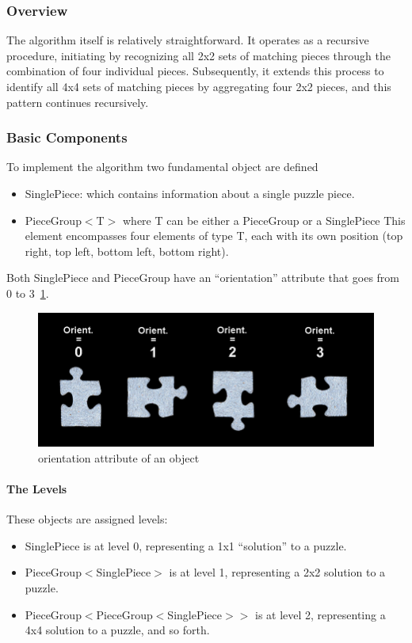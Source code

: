 \documentclass{article}
\begin{document}
\subsubsection{Overview}
The algorithm itself is relatively straightforward.
It operates as a recursive procedure, initiating by recognizing all 2x2
sets of matching pieces through the combination of four individual pieces.
Subsequently, it extends this process to identify all 4x4 sets of matching pieces
by aggregating four 2x2 pieces, and this pattern continues recursively.

\subsubsection{Basic Components}
To implement the algorithm two fundamental object are defined
\begin{itemize}
  \item SinglePiece: which contains information about a single puzzle piece.
  \item PieceGroup\(<\)T\(>\) where T can be either a PieceGroup or a SinglePiece\newline
  This element encompasses four elements of type T, each with its own position (top right, top left, bottom left, bottom right).
\end{itemize}
Both SinglePiece and PieceGroup have an ``orientation'' attribute that goes from 0 to 3~\cref{fig:orientation}.
\begin{figure}[H]
  \caption{orientation attribute of an object}\label{fig:orientation}
  \centering
  \includegraphics[height=0.3\textwidth]{pictures/orientation.png}
\end{figure}

\paragraph{The Levels}

These objects are assigned levels:
\begin{itemize}
\item SinglePiece is at level 0, representing a 1x1 ``solution'' to a puzzle.
\item PieceGroup\(<\)SinglePiece\(>\) is at level 1, representing a 2x2 solution to a puzzle.
\item PieceGroup\(<\)PieceGroup\(<\)SinglePiece\(>>\) is at level 2, representing a 4x4 solution to a puzzle, and so forth.
\end{itemize}
\end{document}
